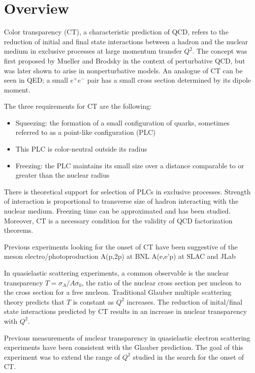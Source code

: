 \section{Overview}
Color transparency (CT), a characteristic prediction of QCD, refers to the
reduction of initial and final state interactions between a hadron and the
nuclear medium in exclusive processes at large momentum transfer $Q^2$.
The concept was first proposed by Mueller and Brodsky in the context of
perturbative QCD, but was later shown to arise in nonperturbative models.
An analogue of CT can be seen in QED; a small $e^+e^-$ pair has a small cross
section determined by its dipole moment.


The three requirements for CT are the following:
\begin{itemize}
    \item Squeezing: the formation of a small configuration of quarks, sometimes
          referred to as a point-like configuration (PLC)
    \item This PLC is color-neutral outside its radius
    \item Freezing: the PLC maintains its small size over a distance comparable
          to or greater than the nuclear radius
\end{itemize}
There is theoretical support for selection of PLCs in exclusive processes.
Strength of interaction is proportional to transverse size of hadron interacting
with the nuclear medium.
Freezing time can be approximated and has been studied.
Moreover, CT is a necessary condition for the validity of QCD factorization
theorems.


Previous experiments looking for the onset of CT have been suggestive of the
meson electro/photoproduction
A(p,2p) at BNL
A(e,e'p) at SLAC and JLab


In quasielastic scattering experiments, a common observable is the nuclear
transparency $T=\sigma_A/A\sigma_0$, the ratio of the nuclear cross section per
nucleon to the cross section for a free nucleon.
Traditional Glauber multiple scattering theory predicts that $T$ is constant as
$Q^2$ increases.
The reduction of inital/final state interactions predicted by CT results in an
increase in nuclear transparency with $Q^2$.


Previous measurements of nuclear transparency in quasielastic electron
scattering experiments have been consistent with the Glauber prediction.
The goal of this experiment was to extend the range of $Q^2$ studied in the
search for the onset of CT.
